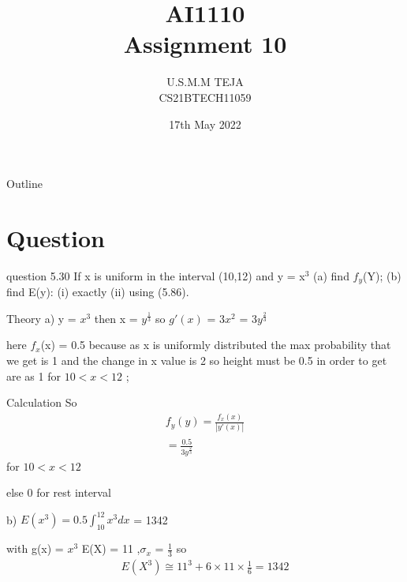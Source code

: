 \documentclass{beamer}
\title{AI1110 \\ Assignment 10}
\author{U.S.M.M TEJA \\ CS21BTECH11059}
\date{17th May 2022}
\begin{document}
	\begin{frame}
		\titlepage
	\end{frame}
	
	\begin{frame}{Outline}
    		\tableofcontents
	\end{frame}
	
	\section{Question}
	\begin{frame}{question 5.30}
If x is uniform in the interval (10,12) and y = x$^{3}$ (a) find $f_{y}$(Y); (b) find E(y): (i) exactly
(ii) using (5.86).
	\end{frame}
	
\begin{frame}{Theory}
a) y = $x^3$ then x = $y^\frac{1}{3}$ so $g'(x)$ = 3$x^2$ = 3$y^\frac{2}{3}$

here $f_{x}$(x) = 0.5 because as x is uniformly distributed the max probability that we get is 1 and the change in x value is 2 so height must be 0.5 in order to get are as 1 for $10 < x < 12$ ;
\end{frame}

    \begin{frame}{Calculation}
    So
\begin{align}
  &f_{y}(y) = \frac{f_{x}(x)}{|y'(x)|}& \\  
  & = \frac{0.5}{3y^\frac{2}{3}} &
\end{align}
for $10 < x <12$

else 0 for rest interval

b) $E(x^3) = 0.5\int_{10}^{12} x^3 dx$ = 1342

with g(x) = $x^3$ E(X) = 11 ,$\sigma _x$ = $\frac{1}{3}$
so
\begin{align}
    E(X^3) \cong 11^3 + 6\times11\times \frac{1}{6} = 1342 
    \end{align}
\end{frame}
\end{document}

